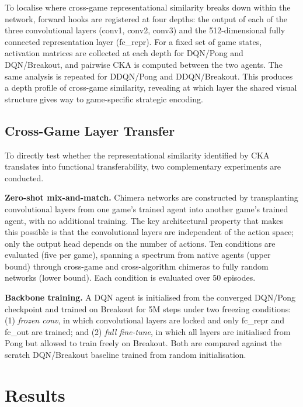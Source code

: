 \documentclass[a4paper]{article}
\begin{document}
To localise where cross-game representational similarity breaks down within the network, forward hooks are registered at four depths: the output of each of the three convolutional layers (conv1, conv2, conv3) and the 512-dimensional fully connected representation layer (fc\_repr). For a fixed set of game states, activation matrices are collected at each depth for DQN/Pong and DQN/Breakout, and pairwise CKA is computed between the two agents. The same analysis is repeated for DDQN/Pong and DDQN/Breakout. This produces a depth profile of cross-game similarity, revealing at which layer the shared visual structure gives way to game-specific strategic encoding.

\subsection{Cross-Game Layer Transfer}

To directly test whether the representational similarity identified by CKA translates into functional transferability, two complementary experiments are conducted.

\textbf{Zero-shot mix-and-match.} Chimera networks are constructed by transplanting convolutional layers from one game's trained agent into another game's trained agent, with no additional training. The key architectural property that makes this possible is that the convolutional layers are independent of the action space; only the output head depends on the number of actions. Ten conditions are evaluated (five per game), spanning a spectrum from native agents (upper bound) through cross-game and cross-algorithm chimeras to fully random networks (lower bound). Each condition is evaluated over 50 episodes.

\textbf{Backbone training.} A DQN agent is initialised from the converged DQN/Pong checkpoint and trained on Breakout for 5M steps under two freezing conditions: (1) \textit{frozen conv}, in which convolutional layers are locked and only fc\_repr and fc\_out are trained; and (2) \textit{full fine-tune}, in which all layers are initialised from Pong but allowed to train freely on Breakout. Both are compared against the scratch DQN/Breakout baseline trained from random initialisation.

\section{Results}
\label{sec:results}
\end{document}

